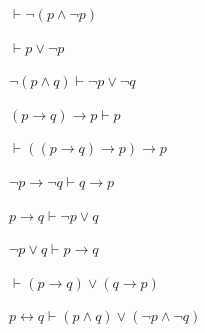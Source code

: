 \begin{pregunta}\label{e1-21}
$\vdash \neg(p \land \neg p)$
\end{pregunta}
\begin{pregunta}\label{e1-22}
$\vdash p \lor \neg p$

\end{pregunta}
\begin{pregunta}\label{e1-23}
$\neg(p \land q) \vdash \neg p \lor \neg q$
\end{pregunta}
\begin{pregunta}\label{e1-24}
$(p \to q) \to p \vdash p$
\end{pregunta}
\begin{pregunta}\label{e1-25}
$\vdash ((p \to q) \to p) \to p$
\end{pregunta}
\begin{pregunta}\label{e1-26}
$\neg p \to \neg q \vdash q \to p$
\end{pregunta}
\begin{pregunta}\label{e1-27}
$p \to q \vdash \neg p \lor q$
\end{pregunta}
\begin{pregunta}\label{e1-28}
$\neg p \lor q \vdash p \to q$
\end{pregunta}
\begin{pregunta}\label{e1-29}
$\vdash (p \to q) \lor (q \to p)$
\end{pregunta}
\begin{pregunta}\label{e1-30}
$p \leftrightarrow q \vdash (p \land q) \lor (\neg p \land \neg q)$
\end{pregunta}

